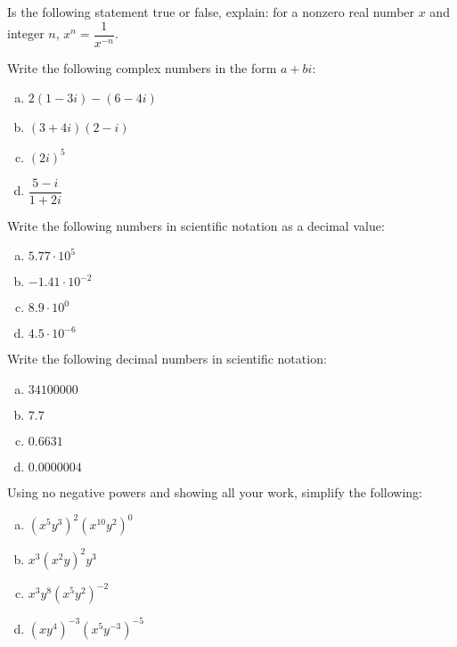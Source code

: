 \documentclass[11pt,letterpaper]{article}
\begin{document}

 Is the following statement true or false, explain: for a nonzero real number $x$ and integer $n$, $x^n= \dfrac{1}{x^{-n}}$.



\newpage



 Write the following complex numbers in the form $a + bi$:
	\begin{enumerate}[(a)]
	\item $2(1 - 3i) - (6 - 4i)$
	\item $(3 + 4i)(2 - i)$
	\item $(2i)^5$
	\item $\dfrac{5 - i}{1 + 2i}$
	\end{enumerate}



\newpage



 Write the following numbers in scientific notation as a decimal value:
	\begin{enumerate}[(a)]
	\item $5.77 \cdot 10^5$
	\item $-1.41 \cdot 10^{-2}$
	\item $8.9 \cdot 10^0$
	\item $4.5 \cdot 10^{-6}$
	\end{enumerate}



\newpage



 Write the following decimal numbers in scientific notation:
	\begin{enumerate}[(a)]
	\item $34100000$
	\item $7.7$
	\item $0.6631$
	\item $0.0000004$
	\end{enumerate}



\newpage



 Using no negative powers and showing all your work, simplify the following:
        \begin{enumerate}[(a)]
        \item $(x^5 y^3)^2 (x^{10} y^2)^0$
        \item $x^3 (x^2y)^2 y^3$
        \item $x^3 y^8(x^5 y^2)^{-2}$
        \item $(xy^4)^{-3} (x^5 y^{-3})^{-5}$
        \end{enumerate}
\end{document}
